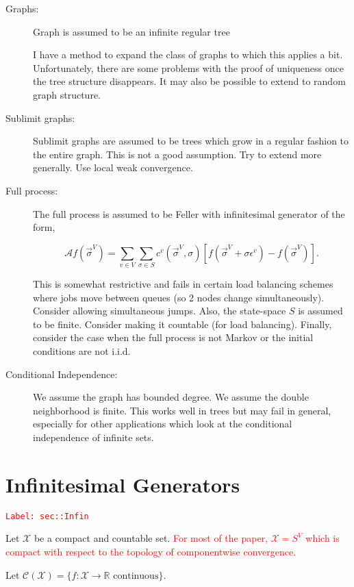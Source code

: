 \documentclass[12pt]{article}
\newcommand{\mb}{\mathbb}
\newcommand{\mc}{\mathcal}
\newcommand{\ra}{\rightarrow}
\newcommand{\te}{\text}
\newcommand{\ep}{\epsilon}
\newcommand{\tr}{\textcolor{red}}
\newcommand{\labe}[1]{\tr{\texttt{Label: #1}}}
\renewcommand{\v}{v}							%
\renewcommand{\S}{S}							%
\newcommand{\s}{\sigma}							%
\newcommand{\sv}{\vec{\s}}						%
\newcommand{\ev}{\ep}							%
\newcommand{\IG}{\mc{A}}						%
\newcommand{\IGr}{c}							%
\newcommand{\vind}[1]{^{#1}}					%
\newcommand{\carp}[1]{^{#1}}					%
\newcommand{\vsi}[1]{^{#1}}						%
\newcommand{\cont}{\mc{C}}						%
\newcommand{\spce}{\mc{X}}						%
\begin{document}
\begin{description}
\item[Graphs: ] Graph is assumed to be an infinite regular tree

I have a method to expand the class of graphs to which this applies a bit. Unfortunately, there are some problems with the proof of uniqueness once the tree structure disappears. It may also be possible to extend to random graph structure.

\item[Sublimit graphs: ] Sublimit graphs are assumed to be trees which grow in a regular fashion to the entire graph. This is not a good assumption. Try to extend more generally. Use local weak convergence.

\item[Full process: ] The full process is assumed to be Feller with infinitesimal generator of the form,

\[\IG f(\sv\vsi{V}) = \sum_{\v \in V}\sum_{\s \in \S} \IGr\vind{\v}(\sv\vsi{V},\s)[f(\sv\vsi{V} + \s \ev\vind{\v}) - f(\sv\vsi{V})].\]

This is somewhat restrictive and fails in certain load balancing schemes where jobs move between queues (so 2 nodes change simultaneously). Consider allowing simultaneous jumps. Also, the state-space \(\S\) is assumed to be finite. Consider making it countable (for load balancing). Finally, consider the case when the full process is not Markov or the initial conditions are not i.i.d.

\item[Conditional Independence: ] We assume the graph has bounded degree. We assume the double neighborhood is finite. This works well in trees but may fail in general, especially for other applications which look at the conditional independence of infinite sets.
\end{description}

\newpage
\appendix

\section{Infinitesimal Generators}
\label{sec::Infin}\labe{sec::Infin}

Let \(\spce\) be a compact and countable set. \tr{For most of the paper, \(\spce = \S\carp{V}\) which is compact with respect to the topology of componentwise convergence.}

Let \(\cont(\spce)= \{f:\spce \ra \mb{R} \te{ continuous}\}\).
\end{document}
